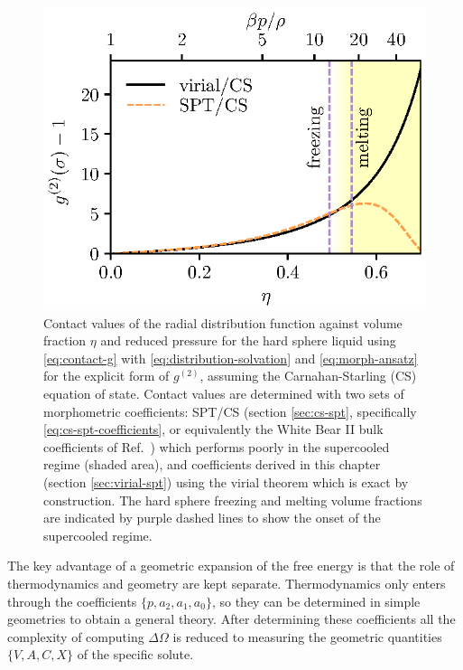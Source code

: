\documentclass[11pt,twoside]{report}
\begin{document}
\begin{figure}
  \includegraphics[width=\linewidth,outer]{g2-contact}
  \caption{
    Contact values of the radial distribution function against volume fraction $\eta$ and reduced pressure for the hard sphere liquid using \eqref{eq:contact-g} with \eqref{eq:distribution-solvation} and \eqref{eq:morph-ansatz} for the explicit form of $g^{(2)}$, assuming the Carnahan-Starling (CS) equation of state.
    Contact values are determined with two sets of morphometric coefficients: SPT/CS (section \ref{sec:cs-spt}, specifically \eqref{eq:cs-spt-coefficients}, or equivalently the White Bear II bulk coefficients of Ref.\ \cite{Hansen-GoosJPCM2006}) which performs poorly in the supercooled regime (shaded area), and coefficients derived in this chapter (section \ref{sec:virial-spt}) using the virial theorem which is exact by construction.
    The hard sphere freezing and melting volume fractions are indicated by purple dashed lines to show the onset of the supercooled regime.
  }
  \label{fig:contact-g}
\end{figure}

The key advantage of a geometric expansion of the free energy is that the role of thermodynamics and geometry are kept separate.
Thermodynamics only enters through the coefficients $\{p,a_2,a_1,a_0\}$, so they can be determined in simple geometries to obtain a general theory.
After determining these coefficients all the complexity of computing $\Delta \Omega$ is reduced to measuring the geometric quantities $\{V,A,C,X\}$ of the specific solute.
\end{document}
